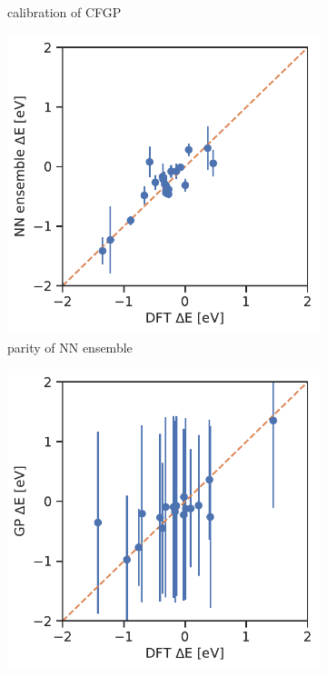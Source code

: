 \documentclass[]{achemso}
\begin{document}
\begin{figure}
\begin{subfigure}[b]{0.32\textwidth}
        \caption{calibration of \gls{CFGP}}\label{fig:calibration_example_cfgp}
    \end{subfigure}
    \begin{subfigure}[b]{0.32\textwidth}
        \includegraphics[width=\textwidth]{../NN_ensemble/error_bar_parity.pdf}
        \caption{parity of \gls{NN} ensemble}\label{fig:error_bar_ensemble}
    \end{subfigure}
    \begin{subfigure}[b]{0.32\textwidth}
        \includegraphics[width=\textwidth]{../GP/Matern/error_bar_parity.pdf}

\end{subfigure}
\end{figure}
\end{document}
